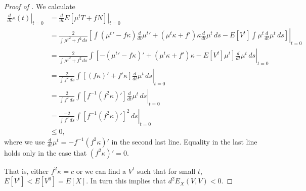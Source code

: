 \documentclass[12pt]{article}
\begin{document}
\begin{proof}[Proof of ]
We  calculate
\begin{align*}
\left.\frac{d}{dt}e(t)\right|_{t=0}&= \left.\frac{d}{dt}E[\mu^t T+ fN]  \right|_{t=0} \\
 &= \left.
\frac{2}{\int {{\mu^t}}^2 + f^2 \,ds }\left[
{\int ({\mu^t}'-f\kappa)\frac{d}{dt}{\mu^t}'   + ({\mu^t}\kappa+ f')\kappa \frac{d}{dt}{\mu^t}  \,ds }- E[V^t]{\int {\mu^t} \frac{d}{dt}{\mu^t} \,ds }\right]
 \right|_{t=0}  \\
 &= \left.
\frac{2}{\int {{\mu^t}}^2 + f^2 \,ds }
\int \left[   -({\mu^t}'-f\kappa)'  + ({\mu^t}\kappa+ f')\kappa - E[V^t] {\mu^t}
\right]
\frac{d}{dt}{\mu^t}
\,ds   \right|_{t=0}
\\
&= \left.
\frac{2}{\int  f^2 \,ds }
\int \left[   (f\kappa)'  +  f'\kappa
\right]
\frac{d}{dt}{\mu^t}
\,ds   \right|_{t=0}
\\
&= \left.
\frac{2}{\int  f^2 \,ds }
\int \left[  f^{-1} (f^2\kappa)'
\right]
\frac{d}{dt}{\mu^t}
\,ds   \right|_{t=0}
\\
&= \left.
\frac{-2}{\int  f^2 \,ds }
\int \left[  f^{-1} (f^2\kappa)'
\right]^2
\,ds   \right|_{t=0}
 \\&\le 0,
\end{align*}
where we use $\frac{d}{dt}{\mu^t}=-{f}^{-1}(f^2\kappa)'$ in the second last line.   Equality in the last line holds only in the case that $(f^2\kappa)'=0$.

That is, either $f^2\kappa=c$ or we can find a $V^t$ such that for small $t$, $E[V^t]<E[V^0]=E[X]$.   In turn this implies that $d^2E_X(V,V)<0$.
\end{proof}

\printbibliography
\end{document}
